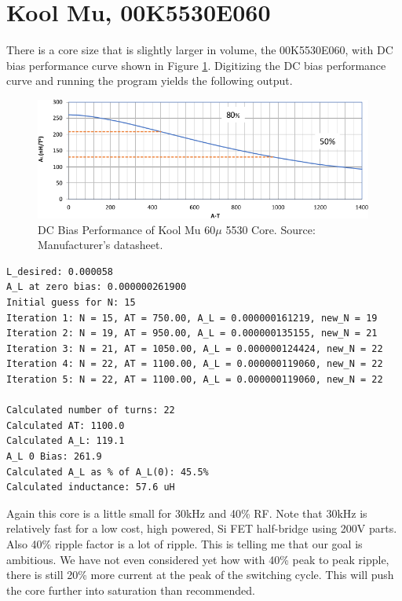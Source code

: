 \documentclass{article}
\begin{document}
\section{Kool Mu, 00K5530E060}

There is a core size that is slightly larger in volume, the 00K5530E060, with DC bias performance curve shown in Figure \ref{fig:dcbias_5530}.  Digitizing the DC bias performance curve and running the program yields the following output. \\

\begin{figure}[H]
    \centering
    \includegraphics[height=4cm]{00K5530E060_dcbias_notitle.png}
    \caption{DC Bias Performance of Kool Mu $60\mu$ 5530 Core. Source: Manufacturer's datasheet.}
    \label{fig:dcbias_5530}
\end{figure}

\begin{verbatim}
L_desired: 0.000058
A_L at zero bias: 0.000000261900
Initial guess for N: 15
Iteration 1: N = 15, AT = 750.00, A_L = 0.000000161219, new_N = 19
Iteration 2: N = 19, AT = 950.00, A_L = 0.000000135155, new_N = 21
Iteration 3: N = 21, AT = 1050.00, A_L = 0.000000124424, new_N = 22
Iteration 4: N = 22, AT = 1100.00, A_L = 0.000000119060, new_N = 22
Iteration 5: N = 22, AT = 1100.00, A_L = 0.000000119060, new_N = 22

Calculated number of turns: 22
Calculated AT: 1100.0
Calculated A_L: 119.1
A_L 0 Bias: 261.9
Calculated A_L as % of A_L(0): 45.5%
Calculated inductance: 57.6 uH
\end{verbatim}

Again this core is a little small for 30kHz and 40\% RF.  Note that 30kHz is relatively fast for a low cost, high powered, Si FET half-bridge using 200V parts.  Also 40\% ripple factor is a lot of ripple.  This is telling me that our goal is ambitious.  We have not even considered yet how with 40\% peak to peak ripple, there is still 20\% more current at the peak of the switching cycle.  This will push the core further into saturation than recommended.
\end{document}
